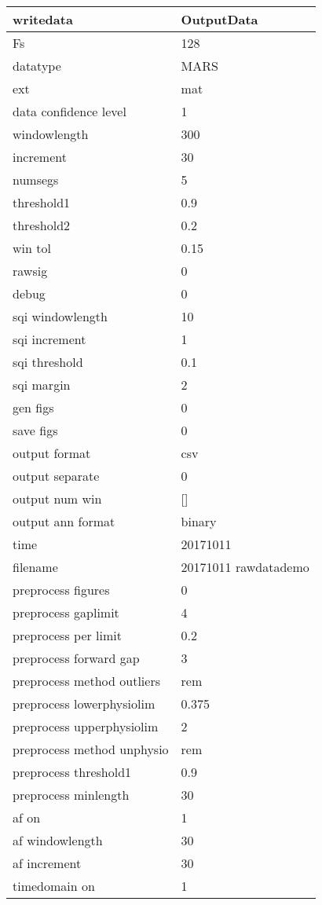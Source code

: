 \begin{tabular}{|l|l|}
\hline
writedata&OutputData\\\hline
Fs&128\\\hline
datatype&MARS\\\hline
ext&mat\\\hline
data confidence level&1\\\hline
windowlength&300\\\hline
increment&30\\\hline
numsegs&5\\\hline
threshold1&0.9\\\hline
threshold2&0.2\\\hline
win tol&0.15\\\hline
rawsig&0\\\hline
debug&0\\\hline
sqi windowlength&10\\\hline
sqi increment&1\\\hline
sqi threshold&0.1\\\hline
sqi margin&2\\\hline
gen figs&0\\\hline
save figs&0\\\hline
output format&csv\\\hline
output separate&0\\\hline
output num win&[]\\\hline
output ann format&binary\\\hline
time&20171011\\\hline
filename&20171011 rawdatademo\\\hline
preprocess figures&0\\\hline
preprocess gaplimit&4\\\hline
preprocess per limit&0.2\\\hline
preprocess forward gap&3\\\hline
preprocess method outliers&rem\\\hline
preprocess lowerphysiolim&0.375\\\hline
preprocess upperphysiolim&2\\\hline
preprocess method unphysio&rem\\\hline
preprocess threshold1&0.9\\\hline
preprocess minlength&30\\\hline
af on&1\\\hline
af windowlength&30\\\hline
af increment&30\\\hline
timedomain on&1\\\hline

\end{tabular}

